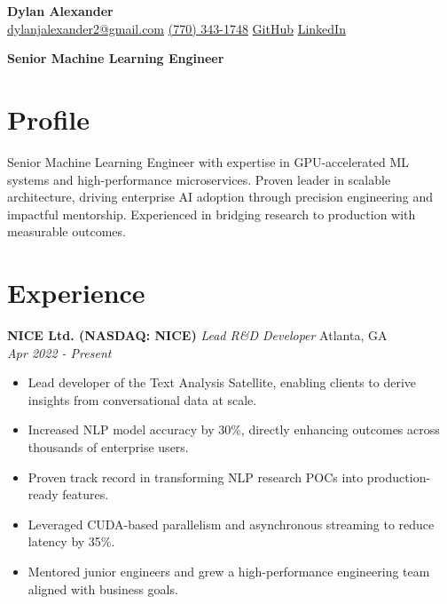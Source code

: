 \documentclass[10pt, letterpaper]{article}
\begin{document}
\begin{center}
    {\LARGE \textbf{Dylan Alexander}} \\[4pt]
    \href{mailto:dylanjalexander2@gmail.com}{dylanjalexander2@gmail.com} \quad
    \href{tel:7703431748}{(770) 343-1748} \quad
    \href{https://github.com/wisenickel5}{GitHub} \quad
    \href{https://linkedin.com/in/yourusername}{LinkedIn}
\end{center}



\begin{center}
    \textbf{Senior Machine Learning Engineer}
\end{center}

\vspace{0.3 cm}



\section*{Profile}
Senior Machine Learning Engineer with expertise in GPU-accelerated ML systems and high-performance microservices. Proven leader in scalable architecture, driving enterprise AI adoption through precision engineering and impactful mentorship. Experienced in bridging research to production with measurable outcomes.

\vspace{0.3 cm}



\section*{Experience}

\textbf{NICE Ltd. (NASDAQ: NICE)} \hfill \textit{Lead R\&D Developer} \hfill Atlanta, GA\\
\textit{Apr 2022 - Present}
\begin{itemize}
    \item Lead developer of the Text Analysis Satellite, enabling clients to derive insights from conversational data at scale.
    \item Increased NLP model accuracy by 30\%, directly enhancing outcomes across thousands of enterprise users.
    \item Proven track record in transforming NLP research POCs into production-ready features.
    \item Leveraged CUDA-based parallelism and asynchronous streaming to reduce latency by 35\%.
    \item Mentored junior engineers and grew a high-performance engineering team aligned with business goals.
\end{itemize}
\end{document}
